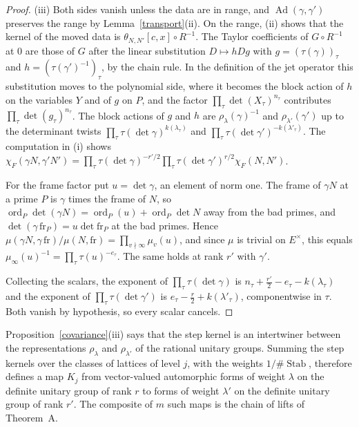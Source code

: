 \begin{proof}
(iii) Both sides vanish unless the data are in range, and $\operatorname{Ad}(\gamma,\gamma')$ preserves the range by Lemma~\ref{transport}(ii). On the range, (ii) shows that the kernel of the moved data is $\theta_{N,N'}[c,x]\circ R^{-1}$. The Taylor coefficients of $G\circ R^{-1}$ at $0$ are those of $G$ after the linear substitution $D\mapsto hDg$ with $g=(\tau(\gamma))_\tau$ and $h=(\tau(\gamma')^{-1})_\tau$, by the chain rule. In the definition of the jet operator this substitution moves to the polynomial side, where it becomes the block action of $h$ on the variables $Y$ and of $g$ on $P$, and the factor $\prod_\tau\det(X_\tau)^{n_\tau}$ contributes $\prod_\tau\det(g_\tau)^{n_\tau}$. The block actions of $g$ and $h$ are $\rho_\lambda(\gamma)^{-1}$ and $\rho_{\lambda'}(\gamma')$ up to the determinant twists $\prod_\tau\tau(\det\gamma)^{k(\lambda_\tau)}$ and $\prod_\tau\tau(\det\gamma')^{-k(\lambda'_\tau)}$. The computation in (i) shows $\chi_F(\gamma N,\gamma'N')=\prod_\tau\tau(\det\gamma)^{-r'/2}\prod_\tau\tau(\det\gamma')^{r/2}\chi_F(N,N')$.

For the frame factor put $u=\det\gamma$, an element of norm one. The frame of $\gamma N$ at a prime $P$ is $\gamma$ times the frame of $N$, so $\operatorname{ord}_P\det(\gamma N)=\operatorname{ord}_P(u)+\operatorname{ord}_P\det N$ away from the bad primes, and $\det(\gamma\,\mathrm{fr}_P)=u\det\mathrm{fr}_P$ at the bad primes. Hence $\mu(\gamma N,\gamma\,\mathrm{fr})/\mu(N,\mathrm{fr})=\prod_{v\nmid\infty}\mu_v(u)$, and since $\mu$ is trivial on $E^\times$, this equals $\mu_\infty(u)^{-1}=\prod_\tau\tau(u)^{-e_\tau}$. The same holds at rank $r'$ with $\gamma'$.

Collecting the scalars, the exponent of $\prod_\tau\tau(\det\gamma)$ is $n_\tau+\frac{r'}2-e_\tau-k(\lambda_\tau)$ and the exponent of $\prod_\tau\tau(\det\gamma')$ is $e_\tau-\frac r2+k(\lambda'_\tau)$, componentwise in $\tau$. Both vanish by hypothesis, so every scalar cancels.
\end{proof}

Proposition~\ref{covariance}(iii) says that the step kernel is an intertwiner between the representations $\rho_\lambda$ and $\rho_{\lambda'}$ of the rational unitary groups. Summing the step kernels over the classes of lattices of level $j$, with the weights $1/\#\operatorname{Stab}$, therefore defines a map $K_j$ from vector-valued automorphic forms of weight $\lambda$ on the definite unitary group of rank $r$ to forms of weight $\lambda'$ on the definite unitary group of rank $r'$. The composite of $m$ such maps is the chain of lifts of Theorem~A.
